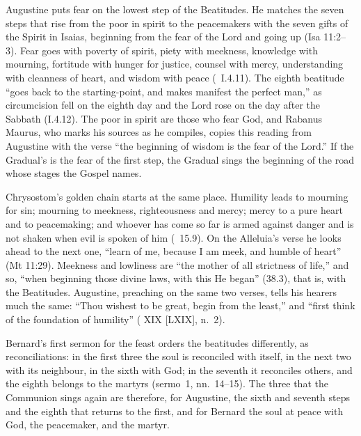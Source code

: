 Augustine puts fear on the lowest step of the Beatitudes. He matches the seven
steps that rise from the poor in spirit to the peacemakers with the seven
gifts of the Spirit in Isaias, beginning from the fear of the Lord and going
up (Isa 11:2--3). Fear goes with poverty of spirit, piety with meekness, knowledge
with mourning, fortitude with hunger for justice, counsel with mercy,
understanding with cleanness of heart, and wisdom with peace (\ I.4.11). The eighth beatitude ``goes back to the starting-point,
and makes manifest the perfect man,'' as circumcision fell on the eighth day
and the Lord rose on the day after the Sabbath (I.4.12). The poor in spirit
are those who fear God, and Rabanus Maurus, who marks his sources as he
compiles, copies this reading from Augustine with the verse ``the beginning
of wisdom is the fear of the Lord.'' If the Gradual's  is
the fear of the first step, the Gradual sings the beginning of the road whose
stages the Gospel names.

Chrysostom's golden chain starts at the same place. Humility leads to
mourning for sin; mourning to meekness, righteousness and mercy; mercy to a
pure heart and to peacemaking; and whoever has come so far is armed against
danger and is not shaken when evil is spoken of him (\ 15.9). On the Alleluia's verse he looks ahead to the next one, ``learn
of me, because I am meek, and humble of heart'' (Mt 11:29). Meekness and
lowliness are ``the mother of all strictness of life,'' and so, ``when
beginning those divine laws, with this He began'' (38.3), that is, with the
Beatitudes. Augustine, preaching on the same two verses, tells his hearers
much the same: ``Thou wishest to be great, begin from the least,'' and ``first
think of the foundation of humility'' ( XIX [LXIX], n.~2).

Bernard's first sermon for the feast orders the beatitudes differently, as
reconciliations: in the first three the soul is reconciled with itself, in
the next two with its neighbour, in the sixth with God; in the seventh it
reconciles others, and the eighth belongs to the martyrs (sermo~1,
nn.~14--15). The three that the Communion sings again are therefore, for
Augustine, the sixth and seventh steps and the eighth that returns to the
first, and for Bernard the soul at peace with God, the peacemaker, and the
martyr.

